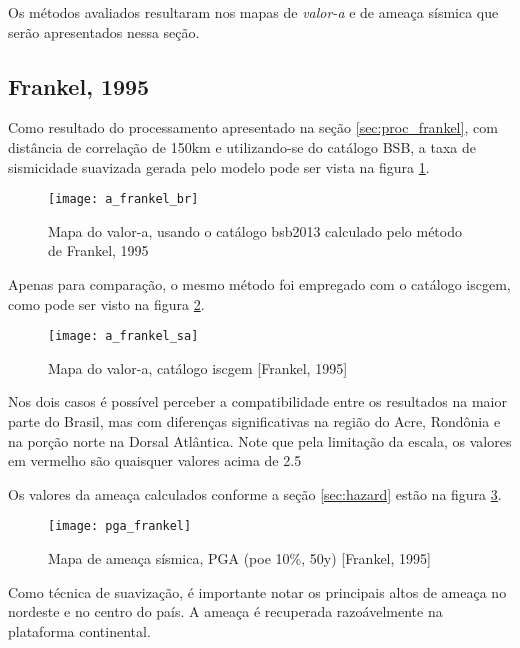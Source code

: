 Os métodos avaliados resultaram nos mapas de \emph{valor-a} e de ameaça sísmica
que serão apresentados nessa seção.

\subsection{Frankel, 1995}
\label{sec:frankel_resultados}

Como resultado do processamento apresentado na seção \ref{sec:proc_frankel},
com distância de correlação de 150km e utilizando-se do catálogo BSB,
a taxa de sismicidade suavizada gerada pelo modelo pode ser vista na figura \ref{fig:a_fran_br}.
\begin{figure}[H]
  \centering
  \texttt{[image: a\_frankel\_br]} 
  \caption{Mapa do valor-a, usando o catálogo \gls{bsb2013} calculado pelo método de Frankel, 1995 }
  \label{fig:a_fran_br} 
\end{figure}

Apenas para comparação, o mesmo método foi empregado com o catálogo \gls{iscgem}, como pode ser visto na figura 
\ref{fig:a_fran_sa}.

\begin{figure}[H]
  \centering
  \texttt{[image: a\_frankel\_sa]} 
  \caption{Mapa do valor-a, catálogo \gls{iscgem} [Frankel, 1995] }
  \label{fig:a_fran_sa} 
\end{figure}

Nos dois casos é possível perceber a compatibilidade entre os resultados na maior parte do Brasil, mas com
diferenças significativas na região do Acre, Rondônia e na porção norte na Dorsal Atlântica. 
Note que pela limitação da escala, os valores em vermelho são quaisquer valores acima de 2.5

Os valores da ameaça calculados conforme a seção \ref{sec:hazard} estão na figura \ref{fig:pga_fran}.

\begin{figure}[H]
  \centering
  \texttt{[image: pga\_frankel]} 
  \caption{Mapa de ameaça sísmica, PGA (poe 10\%, 50y) [Frankel, 1995] }
  \label{fig:pga_fran} 
\end{figure}

Como técnica de suavização, é importante notar os principais altos de ameaça no nordeste e no centro do país.
A ameaça é recuperada razoávelmente na plataforma continental.

